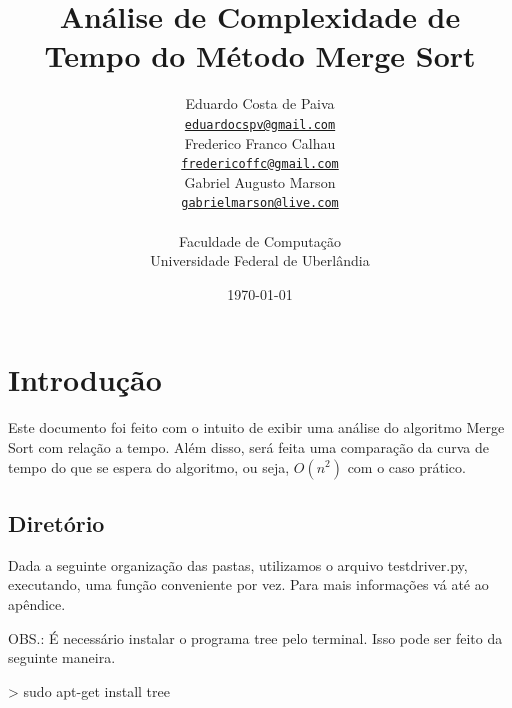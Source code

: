 \documentclass[12pt,a4paper,twoside]{report}
\title{Análise de Complexidade de Tempo do Método Merge Sort}
\date{}
\author{Eduardo Costa de Paiva \\
\texttt{\small \url{eduardocspv@gmail.com}}\\
Frederico Franco Calhau \\
\texttt{\small \url{fredericoffc@gmail.com}}\\
Gabriel Augusto Marson \\
\texttt{\small \url{gabrielmarson@live.com}}\\
\vspace{1cm} \\
Faculdade de Computação \\
Universidade Federal de Uberlândia
}
\date{\today}
\begin{document}
  \maketitle
\listoffigures
\listoftables
\lstlistoflistings

\tableofcontents


\fancyhead[RE,LO]{\thesection}

\setlength{\parskip}{0.15in} %

\chapter{Introdução}
Este documento foi feito com o intuito de exibir uma análise do algoritmo Merge Sort
com relação a tempo. Além disso, será feita uma comparação da curva de tempo do que se espera do
algoritmo, ou seja, $O(n^2)$ com o caso prático.

\section{Diretório}

Dada a seguinte organização das pastas, utilizamos o arquivo testdriver.py,  executando, uma função conveniente por vez. Para mais informações vá até ao apêndice.

OBS.: É necessário instalar o programa tree pelo terminal. Isso pode ser feito da seguinte maneira.

\begin{terminal}
> sudo apt-get install tree
\end{terminal}
\end{document}
